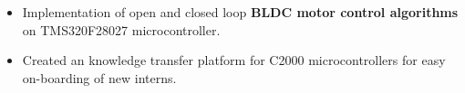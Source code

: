 \documentclass{resume}
\begin{document}
\vspace{-0.8cm}
\vspace{-0.2cm}
\begin{itemize}\setlength{\itemsep}{0pt}\setlength{\parskip}{0pt}\vspace{0.1cm}
    \item Implementation of open and closed loop \textbf{BLDC motor control algorithms} on TMS320F28027 microcontroller.
    \item Created an knowledge transfer platform for C2000 microcontrollers for easy on-boarding of new interns.
\end{itemize}
\vspace{-0.8cm}
\end{document}

